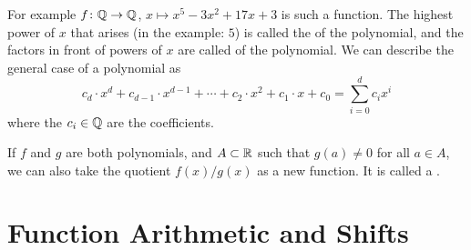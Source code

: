 For example $f\colon{\mathbb Q}\to{\mathbb Q}$, $x\mapsto x^5-3x^2+17x+3$ is such a function.
The highest power of $x$ that arises (in the example: $5$) is called the
 of the polynomial, and the factors in front of powers of $x$
are called  of the polynomial.
We can describe the general case of a polynomial as
\[
c_d\cdot x^d+c_{d-1}\cdot x^{d-1}+\cdots+c_2\cdot x^2+c_1\cdot x+c_0=\sum_{i=0}^d c_ix^i
\]
where the $c_i\in{\mathbb Q}$ are the coefficients.
\bigskip

If $f$ and $g$ are both polynomials, and $A\subset{\mathbb R}$ such that $g(a)\not=0$
for all $a\in A$, we can also take the quotient $f(x)/g(x)$ as a new
function. It is called a .

\section{Function Arithmetic and Shifts}
\label{secfunari}

